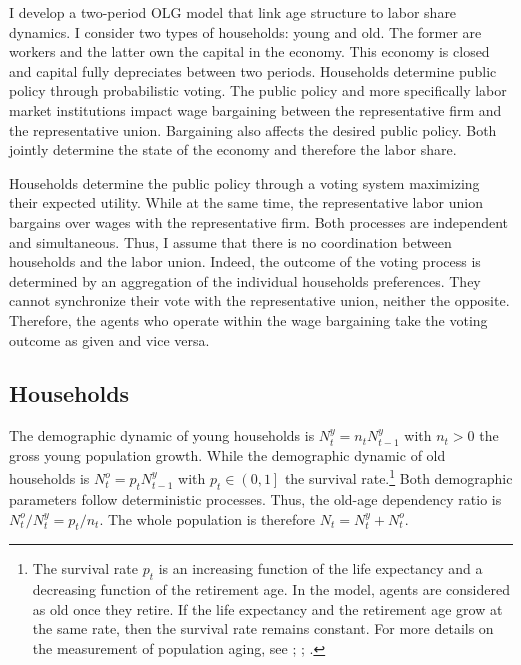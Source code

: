 

I develop a two-period OLG model that link age structure to labor share dynamics. I consider two types of households: young and old. The former are workers and the latter own the capital in the economy. This economy is closed and capital fully depreciates between two periods. Households determine public policy through probabilistic voting. The public policy and more specifically labor market institutions impact wage bargaining between the representative firm and the representative union. Bargaining also affects the desired public policy. Both jointly determine the state of the economy and therefore the labor share.

Households determine the public policy through a voting system maximizing their expected utility. While at the same time, the representative labor union bargains over wages with the representative firm. Both processes are independent and simultaneous. Thus, I assume that there is no coordination between households and the labor union. Indeed, the outcome of the voting process is determined by an aggregation of the individual households preferences. They cannot synchronize their vote with the representative union, neither the opposite. Therefore, the agents who operate within the wage bargaining take the voting outcome as given and vice versa.

\subsection{Households}\label{subsec:households}

The demographic dynamic of young households is $N^y_t = n_t N^y_{t-1}$ with $n_t > 0$ the gross young population growth. While the demographic dynamic of old households is $N^o_t = p_t N^y_{t-1}$ with $p_t \in \left(0,1\right]$ the survival rate.\footnote{The survival rate $p_t$ is an increasing function of the life expectancy and a decreasing function of the retirement age. In the model, agents are considered as old once they retire. If the life expectancy and the retirement age grow at the same rate, then the survival rate remains constant. For more details on the measurement of population aging, see \cite{Sanderson2007}; \cite{Sanderson2013}; \cite{DAlbis2013}.} Both demographic parameters follow deterministic processes. Thus, the old-age dependency ratio is $N^o_t/N^y_t = p_t/n_t$. The whole population is therefore $N_t = N^y_t + N^o_t$.

